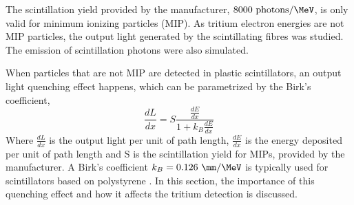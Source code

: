 The scintillation yield provided by the manufacturer, $8000~\text{photons}/\MeV$, is only valid for minimum ionizing particles (MIP). As tritium electron energies are not MIP particles, the output light generated by the scintillating fibres was studied. The emission of scintillation photons were also simulated.

When particles that are not MIP are detected in plastic scintillators, an output light quenching effect happens, which can be parametrized by the Birk's coefficient\cite{BirksPaper}, 
\begin{equation}
\frac{dL}{dx}= S\frac{\displaystyle{\frac{dE}{dx}}}{1+k_B\displaystyle{\frac{dE}{dx}}}
\label{eq:birkscoefficient}
\end{equation}
Where $\frac{dL}{dx}$ is the output light per unit of path length, $\frac{dE}{dx}$ is the energy deposited per unit of path length and S is the scintillation yield for MIPs, provided by the manufacturer. A Birk's coefficient $k_B=0.126~\mm/\MeV$ is typically used for scintillators based on polystyrene \cite{BirksCoefficient}. In this section, the importance of this quenching effect and how it affects the tritium detection is discussed.

